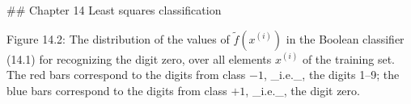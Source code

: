 

## Chapter 14 Least squares classification

Figure 14.2: The distribution of the values of \(\tilde{f}(x^{(i)})\) in the Boolean classifier (14.1) for recognizing the digit zero, over all elements \(x^{(i)}\) of the training set. The red bars correspond to the digits from class \(-1\), _i.e._, the digits 1–9; the blue bars correspond to the digits from class \(+1\), _i.e._, the digit zero.

